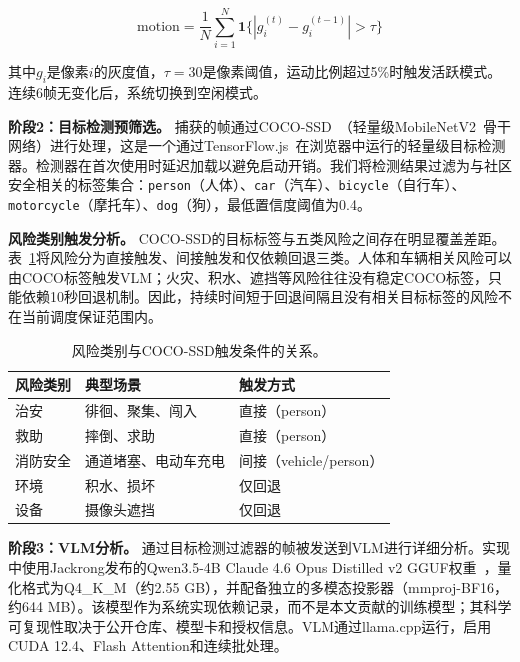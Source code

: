 \documentclass[a4paper,10pt]{ctexart}
\begin{document}
\begin{equation}
\text{motion} = \frac{1}{N} \sum_{i=1}^{N} \mathbf{1}\{|g_i^{(t)} - g_i^{(t-1)}| > \tau\}
\end{equation}

其中$g_i$是像素$i$的灰度值，$\tau = 30$是像素阈值，运动比例超过5\%时触发活跃模式。连续6帧无变化后，系统切换到空闲模式。

\textbf{阶段2：目标检测预筛选。}
捕获的帧通过COCO-SSD~\cite{liu2016ssd}（轻量级MobileNetV2~\cite{sandler2018mobilenetv2}骨干网络）进行处理，这是一个通过TensorFlow.js~\cite{abadi2016tensorflow}在浏览器中运行的轻量级目标检测器。检测器在首次使用时延迟加载以避免启动开销。我们将检测结果过滤为与社区安全相关的标签集合：\texttt{person}（人体）、\texttt{car}（汽车）、\texttt{bicycle}（自行车）、\texttt{motorcycle}（摩托车）、\texttt{dog}（狗），最低置信度阈值为0.4。

\textbf{风险类别触发分析。}
COCO-SSD的目标标签与五类风险之间存在明显覆盖差距。表~\ref{tab:risk_coverage}将风险分为直接触发、间接触发和仅依赖回退三类。人体和车辆相关风险可以由COCO标签触发VLM；火灾、积水、遮挡等风险往往没有稳定COCO标签，只能依赖10秒回退机制。因此，持续时间短于回退间隔且没有相关目标标签的风险不在当前调度保证范围内。

\begin{table}[t]
\centering
\caption{风险类别与COCO-SSD触发条件的关系。}
\label{tab:risk_coverage}
\small
\begin{tabular}{lll}
\toprule
风险类别 & 典型场景 & 触发方式 \\
\midrule
治安 & 徘徊、聚集、闯入 & 直接（person） \\
救助 & 摔倒、求助 & 直接（person） \\
消防安全 & 通道堵塞、电动车充电 & 间接（vehicle/person） \\
环境 & 积水、损坏 & 仅回退 \\
设备 & 摄像头遮挡 & 仅回退 \\
\bottomrule
\end{tabular}
\end{table}

\textbf{阶段3：VLM分析。}
通过目标检测过滤器的帧被发送到VLM进行详细分析。实现中使用Jackrong发布的Qwen3.5-4B Claude 4.6 Opus Distilled v2 GGUF权重~\cite{jackrong2026qwen35gguf}，量化格式为Q4\_K\_M（约2.55 GB），并配备独立的多模态投影器（mmproj-BF16，约644 MB）。该模型作为系统实现依赖记录，而不是本文贡献的训练模型；其科学可复现性取决于公开仓库、模型卡和授权信息。VLM通过llama.cpp运行，启用CUDA 12.4、Flash Attention和连续批处理。
\end{document}
